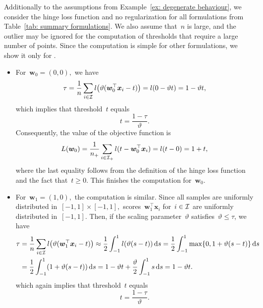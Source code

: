 Additionally to the assumptions from Example~\ref{ex: degenerate behaviour}, we consider the hinge loss function and no regularization for all formulations from Table~\ref{tab: summary formulations}. We also assume that~$n$ is large, and the outlier may be ignored for the computation of thresholds that require a large number of points. Since the computation is simple for other formulations, we show it only for \PatMat.
\begin{itemize}
  \item For~$\bm{w}_0 = (0,0),$ we have
  \begin{equation*}
    \tau
    = \frac{1}{\nall}\sum_{i \in \I} l\Brac{\vartheta(\bm{w}_0^\top \bm{x}_i - t)}
    = l(0 - \vartheta t) = 1 - \vartheta t,
  \end{equation*}
  which implies that threshold~$t$ equals
  \begin{equation}\label{eq: PatMat threshold 0}
    t = \frac{1-\tau}{\vartheta}.
  \end{equation}
  Consequently, the value of the objective function is
  \begin{equation}\label{eq: PatMat objective 0}
    L(\bm{w}_0)
      = \frac{1}{n_{+}} \sum_{i \in \mathcal{I}_{+}} l(t - \bm{w}_0^\top \bm{x}_i)
      = l(t - 0)
      = 1 + t,
  \end{equation}
  where the last equality follows from the definition of the hinge loss function and the fact that~$t \geq 0.$ This finishes the computation for~$\bm{w}_0$.
  \item For~$\bm{w}_1 = (1,0),$ the computation is similar. Since all samples are uniformly distributed in~$[-1,1]\times[-1,1],$ scores~$\bm{w}_1^\top \bm{x}_i$ for~$i \in \mathcal{I}$ are uniformly distributed in~$[-1,1].$ Then, if the scaling parameter~$\vartheta$ satisfies~$\vartheta \leq \tau$, we have
  \begin{align*}
    \tau
      & = \frac{1}{\nall} \sum_{i \in \I} l\Brac{\vartheta (\bm{w}_1^\top \bm{x}_i - t)}
      \approx \frac{1}{2}\int_{-1}^{1} l\Brac{\vartheta(s-t)} \dd{s}
        = \frac{1}{2} \int_{-1}^{1} \max\{0, 1 + \vartheta(s - t)\}\dd{s} \\
      & =\frac{1}{2} \int_{-1}^{1} (1+\vartheta(s - t))\dd{s}
        = 1 - \vartheta t + \frac{\vartheta}{2}\int_{-1}^{1}s\dd{s}
        = 1 - \vartheta t.
  \end{align*}
  which again implies that threshold~$t$ equals
  \begin{equation*}
    t = \frac{1-\tau}{\vartheta}.
  \end{equation*}

\end{itemize}
